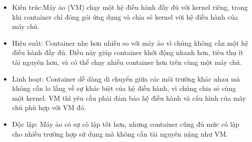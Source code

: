 \documentclass[a4paper,12pt]{article}
\begin{document}
\begin{itemize}
    \item Kiến trúc:Máy ảo (VM) chạy một hệ điều hành đầy đủ với kernel riêng, trong khi container chỉ đóng gói ứng dụng và chia sẻ kernel với hệ điều hành của máy chủ.
    \item Hiệu suất: Container nhẹ hơn nhiều so với máy ảo vì chúng không cần một hệ điều hành đầy đủ. Điều này giúp container khởi động nhanh hơn, tiêu thụ ít tài nguyên hơn, và có thể chạy nhiều container hơn trên cùng một máy chủ.
    \item Linh hoạt: Container dễ dàng di chuyển giữa các môi trường khác nhau mà không cần lo lắng về sự khác biệt của hệ điều hành, vì chúng chia sẻ cùng một kernel. VM thì yêu cầu phải đảm bảo hệ điều hành và cấu hình của máy chủ phù hợp với VM đó.
    \item Độc lập: Máy ảo có sự cô lập tốt hơn, nhưng container cũng đủ mức cô lập cho nhiều trường hợp sử dụng mà không cần tài nguyên nặng như VM.
\end{itemize}
\end{document}
